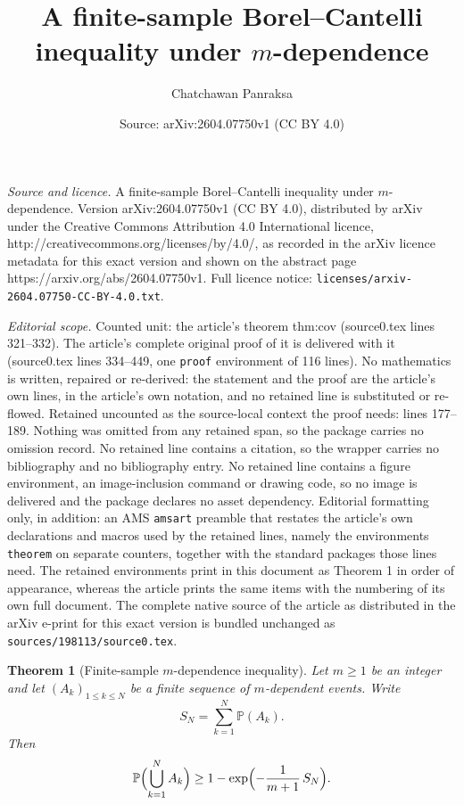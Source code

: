 \documentclass[10pt,a4paper]{amsart}
\title{A finite-sample Borel--Cantelli inequality under $m$-dependence}
\author{Chatchawan Panraksa}
\date{Source: arXiv:2604.07750v1 (CC BY 4.0)}
\newtheorem{theorem}{Theorem}
\begin{document}
\maketitle

\noindent\emph{Source and licence.} A finite-sample Borel--Cantelli inequality under $m$-dependence. Version arXiv:2604.07750v1 (CC BY 4.0), distributed by arXiv under the Creative Commons Attribution 4.0 International licence, http://creativecommons.org/licenses/by/4.0/, as recorded in the arXiv licence metadata for this exact version and shown on the abstract page https://arxiv.org/abs/2604.07750v1. Full licence notice: \texttt{licenses/arxiv-2604.07750-CC-BY-4.0.txt}.\par\smallskip

\noindent\textit{Editorial scope.} Counted unit: the article's theorem thm:cov (source0.tex lines 321--332). The article's complete original proof of it is delivered with it (source0.tex lines 334--449, one \texttt{proof} environment of 116 lines). No mathematics is written, repaired or re-derived: the statement and the proof are the article's own lines, in the article's own notation, and no retained line is substituted or re-flowed.  Retained uncounted as the source-local context the proof needs: lines 177--189.  Nothing was omitted from any retained span, so the package carries no omission record.  No retained line contains a citation, so the wrapper carries no bibliography and no bibliography entry.  No retained line contains a figure environment, an image-inclusion command or drawing code, so no image is delivered and the package declares no asset dependency.  Editorial formatting only, in addition: an AMS \texttt{amsart} preamble that restates the article's own declarations and macros used by the retained lines, namely the environments \texttt{theorem} on separate counters, together with the standard packages those lines need.  The retained environments print in this document as Theorem 1 in order of appearance, whereas the article prints the same items with the numbering of its own full document.  The complete native source of the article as distributed in the arXiv e-print for this exact version is bundled unchanged as \texttt{sources/198113/source0.tex}.
\begin{theorem}[Finite-sample $m$-dependence inequality]
\label{thm:finite}
Let $m\ge 1$ be an integer and let $(A_k)_{1\le k\le N}$ be a finite
sequence of $m$-dependent events.  Write
\[
  S_N=\sum_{k=1}^{N} \mathbb{P}(A_k).
\]
Then
\[
  \mathbb{P}\Bigl(\bigcup_{k=1}^N A_k\Bigr)
  \ge 1 - \exp\Bigl(- \frac{1}{m+1}\,S_N\Bigr).
\]
\end{theorem}
\end{document}
